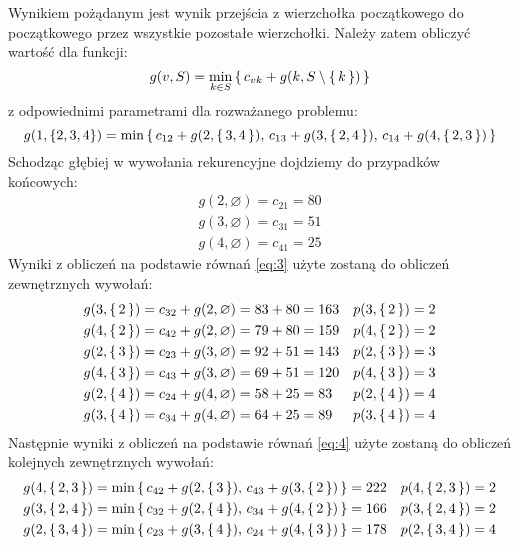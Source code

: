 \documentclass[12pt]{article}
\begin{document}
Wynikiem pożądanym jest wynik przejścia z wierzchołka początkowego do początkowego  przez wszystkie pozostałe wierzchołki. Należy zatem obliczyć wartość dla funkcji:
\begin{equation}
    g(v, S) = \min_{k\in S}{\set{c_{vk}+g(k, S\setminus \set{k})}}
\end{equation}
z odpowiednimi parametrami dla rozważanego problemu:
\begin{equation}
    g(1, \{2,3,4\}) = \min{\set{c_{12}+g(2, \set{3,4}),\, c_{13}+g(3, \set{2,4}),\, c_{14}+g(4, \set{2,3})}}
\end{equation}
Schodząc głębiej w wywołania rekurencyjne dojdziemy do przypadków końcowych:
\begin{subequations}
    \label{eq:3}
    \begin{gather}
        g(2, \varnothing) = c_{21} = 80\\
        g(3, \varnothing) = c_{31} = 51\\
        g(4, \varnothing) = c_{41} = 25
    \end{gather}
\end{subequations}
Wyniki z obliczeń na podstawie równań \ref{eq:3} użyte zostaną do obliczeń zewnętrznych wywołań:
\begin{subequations}
    \label{eq:4}
    \begin{align}
        g(3, \set{2}) = c_{32} + g(2, \varnothing) & = 83 + 80 = 163 & p(3, \set{2}) & = 2 \\
        g(4, \set{2}) = c_{42} + g(2, \varnothing) & = 79 + 80 = 159 & p(4, \set{2}) & = 2 \\
        g(2, \set{3}) = c_{23} + g(3, \varnothing) & = 92 + 51 = 143 & p(2, \set{3}) & = 3 \\
        g(4, \set{3}) = c_{43} + g(3, \varnothing) & = 69 + 51 = 120 & p(4, \set{3}) & = 3 \\
        g(2, \set{4}) = c_{24} + g(4, \varnothing) & = 58 + 25 = 83  & p(2, \set{4}) & = 4 \\
        g(3, \set{4}) = c_{34} + g(4, \varnothing) & = 64 + 25 = 89  & p(3, \set{4}) & = 4
    \end{align}
\end{subequations}
Następnie wyniki z obliczeń na podstawie równań \ref{eq:4} użyte zostaną do obliczeń kolejnych zewnętrznych wywołań:
\begin{subequations}
    \begin{align}
        g(4, \set{2,3}) = \min{\set{c_{42} + g(2, \set{3}),\,c_{43} + g(3, \set{2})}} & = 222 & p(4, \set{2,3}) & = 2 \\
        g(3, \set{2,4}) = \min{\set{c_{32} + g(2, \set{4}),\,c_{34} + g(4, \set{2})}} & = 166 & p(3, \set{2,4}) & = 2 \\
        g(2, \set{3,4}) = \min{\set{c_{23} + g(3, \set{4}),\,c_{24} + g(4, \set{3})}} & = 178 & p(2, \set{3,4}) & = 4
    \end{align}
\end{subequations}
\end{document}
